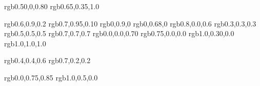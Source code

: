 

\usepackage{color}
\usepackage{xcolor}
\definecolor{darkpurple}  {rgb}{0.50,0,0.80}      %
\definecolor{purple}      {rgb}{0.65,0.35,1.0}    %

\definecolor{spring}    {rgb}{0.6,0.9,0.2}    %
\definecolor{lime}      {rgb}{0.7,0.95,0.10}  %
\definecolor{fluorescentgreen}   {rgb}{0,0.9,0}        %
\definecolor{green}     {rgb}{0,0.68,0}       %
\definecolor{magenta}   {rgb}{0.8,0.0,0.6}    %
\definecolor{dgrey}     {rgb}{0.3,0.3,0.3}    %
\definecolor{grey}      {rgb}{0.5,0.5,0.5}    %
\definecolor{lgrey}     {rgb}{0.7,0.7,0.7}    %
\definecolor{darkblue}  {rgb}{0.0,0.0,0.70}   %
\definecolor{darkred}   {rgb}{0.75,0.0,0.0}   %
\definecolor{orangered} {rgb}{1.0,0.30,0.0}   %
\definecolor{white}     {rgb}{1.0,1.0,1.0}    %




\definecolor{oldcolor}   {rgb}{0.4,0.4,0.6}  %
\definecolor{usedcolor}  {rgb}{0.7,0.2,0.2}  %

\definecolor{note}       {rgb}{0.0,0.75,0.85}     %
\definecolor{oldnote}    {rgb}{1.0,0.5,0.0}       %

